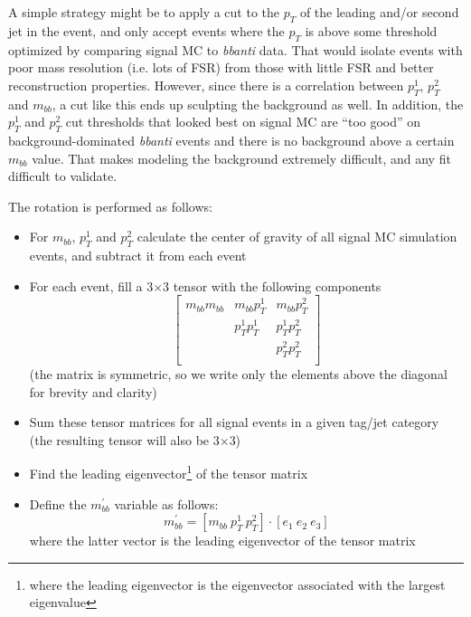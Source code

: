 A simple strategy might be to apply a cut to the $p_T$ of the leading and/or 
second jet in the event, and only accept events where the $p_T$ is above some
threshold optimized by comparing signal MC to \textit{bbanti} data.  
That would isolate events with poor mass resolution (i.e. lots of FSR) from
those with little FSR and better reconstruction properties.  However, since
there is a correlation between $p_T^1$, $p_T^2$ and $m_{bb}$, a cut like
this ends up sculpting the background as well.  In addition, the $p_T^1$ and
$p_T^2$ cut thresholds that looked best on signal MC are ``too good'' on 
background-dominated \textit{bbanti} events and there is no background
above a certain $m_{bb}$ value.  That makes modeling the background extremely 
difficult, and any fit difficult to validate.  

The rotation is performed as follows:
\begin{itemize}
    \item For $m_{bb}$, $p_T^1$ and $p_T^2$ calculate the center of gravity
    of all signal MC simulation events, and subtract it from each event
    \item For each event, fill a 3$\times$3 tensor with the following components
    \begin{equation}
        \begin{bmatrix}
        m_{bb}m_{bb} & m_{bb}p_T^1 & m_{bb}p_T^2 \\
                     & p_T^1 p_T^1 & p_T^1 p_T^2 \\
                     &             & p_T^2 p_T^2 \\ 
        \end{bmatrix}
    \end{equation}
    (the matrix is symmetric, so we write only the elements above the diagonal for
    brevity and clarity)
    \item Sum these tensor matrices for all signal events in a given tag/jet category
    (the resulting tensor will also be 3$\times$3)
    \item Find the leading eigenvector\footnote{where the leading eigenvector is the
    eigenvector associated with the largest eigenvalue} of the tensor matrix
    \item Define the $m_{bb}^{'}$ variable as follows:
    \begin{equation}
        m_{bb}^{'} = [m_{bb}\ p_T^1\ p_T^2] \cdot [e_1\ e_2\ e_3]
    \end{equation}
    where the latter vector is the leading eigenvector of the tensor matrix
\end{itemize}

